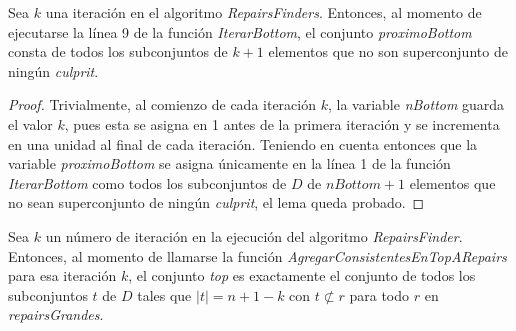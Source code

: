 \documentclass[11pt,a4paper,twoside]{tesis}
\begin{document}
\begin{lemma}\label{proximoBottom_cardinalidad_k}
Sea $k$ una iteración en el algoritmo \textit{RepairsFinders}. Entonces, al momento de ejecutarse la línea 9 de la función \textit{IterarBottom}, el conjunto \textit{proximoBottom} consta de todos los subconjuntos de $k + 1$ elementos que no son superconjunto de ningún \textit{culprit}.
\end{lemma}

\begin{proof}
Trivialmente, al comienzo de cada iteración $k$, la variable \textit{nBottom} guarda el valor $k$, pues esta se asigna en 1 antes de la primera iteración y se incrementa en una unidad al final de cada iteración. Teniendo en cuenta entonces que la variable \textit{proximoBottom} se asigna únicamente en la línea 1 de la función \textit{IterarBottom} como todos los subconjuntos de  $D$ de $nBottom + 1$ elementos que no sean superconjunto de ningún \textit{culprit}, el lema queda probado.
\end{proof}


\begin{lemma}\label{tamano_top_2}
Sea $k$ un número de iteración en la ejecución del algoritmo \textit{RepairsFinder}. Entonces, al momento de llamarse la función \textit{AgregarConsistentesEnTopARepairs} para esa iteración $k$, el conjunto \textit{top} es exactamente el conjunto de todos los subconjuntos $t$ de $D$ tales que $|t| = n + 1 - k$ con $t \not\subset r$ para todo $r$ en \textit{repairsGrandes}.
\end{lemma}
\end{document}
